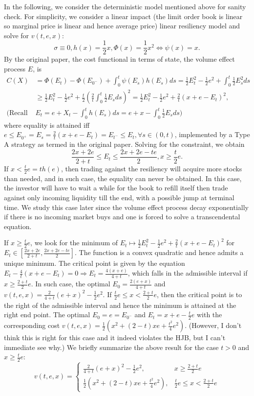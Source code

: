 \documentclass[openany,oneside]{article}
\theoremstyle{definition}
\theoremstyle{remark}
\begin{document}
{In the following, we consider the deterministic model mentioned above for sanity check. For simplicity, we consider a linear impact (the limit order book is linear so marginal price is linear and hence average price) linear resiliency model and solve for $v(t,e,x)$:
$$\sigma\equiv 0, h(x)=\frac{1}{2}x, \Phi(x)=\frac{1}{2}x^2 \Leftrightarrow \psi(x)=x.$$
By the original paper, the cost functional in terms of state, the volume effect process $E$, is
\begin{align*}
C(X) &= \Phi(E_t)-\Phi(E_{0^-})+\int_0^t \psi(E_s) h(E_s) ds = \frac{1}{2}E^2_t - \frac{1}{2}e^2 + \int_0^t \frac{1}{2} E^2_s ds \\
&\ge \frac{1}{2}E^2_t - \frac{1}{2}e^2 + \frac{t}{2}\left(\frac{2}{t}\int_0^t \frac{1}{2}E_s ds\right)^2 = \frac{1}{2}E^2_t - \frac{1}{2}e^2 + \frac{2}{t}(x+e-E_t)^2, \\
\textrm{(Recall } & E_t=e+X_t-\int_0^t h(E_s)ds = e+x-\int_0^t \frac{1}{2}E_s ds \textrm{)}
\end{align*}
where equality is attained iff $e\le E_{0^+}=E_s=\frac{2}{t}(x+e-E_t)=E_{t^-}\le E_t,\forall s\in(0,t)$, implemented by a Type A strategy as termed in the original paper. Solving for the constraint, we obtain
$$\frac{2x+2e}{2+t} \le E_t \le \frac{2x+2e-te}{2}, x\ge \frac{t}{2}e.$$
If $x< \frac{t}{2}e = t h(e)$, then trading against the resiliency will acquire more stocks than needed, and in such case, the equality can never be obtained. In this case, the investor will have to wait a while for the book to refill itself then trade against only incoming liquidity till the end, with a possible jump at terminal time. We study this case later since the volume effect process decay exponentially if there is no incoming market buys and one is forced to solve a transcendental equation.

If $x\ge \frac{t}{2}e$, we look for the minimum of $E_t \mapsto \frac{1}{2}E^2_t - \frac{1}{2}e^2 + \frac{2}{t}(x+e-E_t)^2$ for $E_t \in \left[\frac{2x+2e}{2+t}, \frac{2x+2e-te}{2}\right]$. The function is a convex quadratic and hence admits a unique minimum. The critical point is given by the equation $E_t - \frac{4}{t}(x+e-E_t)=0 \Rightarrow E_t=\frac{4(x+e)}{4+t}$, which falls in the admissible interval if $x\ge \frac{2+t}{2}e$. In such case, the optimal $E_0=\frac{2(e+x)}{4+t}$ and $v(t,e,x)=\frac{2}{4+t}(e+x)^2 - \frac{1}{2}e^2$. If $\frac{t}{2}e \le x < \frac{2+t}{2}e$, then the critical point is to the right of the admissible interval and hence the minimum is attained at the right end point. The optimal $E_0=e=E_{0^-}$ and $E_t=x+e-\frac{t}{2}e$ with the corresponding cost $v(t,e,x)=\frac{1}{2}\left(x^2+(2-t)xe+\frac{t^2}{4}e^2\right)$. (However, I don't think this is right for this case and it indeed violates the HJB, but I can't immediate see why.) We briefly summarize the above result for the case $t>0$ and $x\ge \frac{t}{2}e$:
$$v(t,e,x)=
\begin{cases}
\frac{2}{4+t}(e+x)^2 - \frac{1}{2}e^2, & x\ge\frac{2+t}{2}e \\
\frac{1}{2}\left(x^2+(2-t)xe+\frac{t^2}{4}e^2\right), & \frac{t}{2}e \le x < \frac{2+t}{2}e
\end{cases}$$

}
\end{document}

